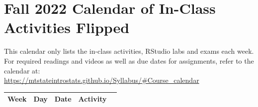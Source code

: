 \documentclass[
]{report}
\begin{document}
\nocite{*}

\hypertarget{fall-2022-calendar-of-in-class-activities-flipped}{%
\chapter*{Fall 2022 Calendar of In-Class Activities Flipped}\label{fall-2022-calendar-of-in-class-activities-flipped}}

This calendar only lists the in-class activities, RStudio labs and exams each week. For required readings and videos as well as due dates for assignments, refer to the calendar at:\\
\url{https://mtstateintrostats.github.io/Syllabus/\#Course_calendar}

\begin{longtable}{|l|l|l|l|p{}|}
\hline
\textbf{Week}& \textbf{Day}& \textbf{Date}& \textbf{Activity} \\ \hline
\endhead


\end{longtable}
\end{document}
